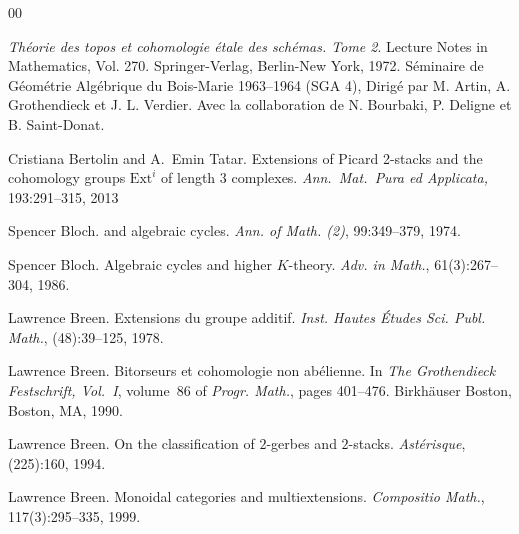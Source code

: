 \documentclass{amsart}
\numberwithin{equation}{subsection}
\theoremstyle{remark}
\theoremstyle{remark}
\begin{document}
  
\begin{thebibliography}{00}

 \emph{Th\'eorie des topos et cohomologie \'etale des sch\'emas. {T}ome 2}.
\newblock Lecture Notes in Mathematics, Vol. 270. Springer-Verlag, Berlin-New
  York, 1972.
\newblock S{\'e}minaire de G{\'e}om{\'e}trie Alg{\'e}brique du Bois-Marie
  1963--1964 (SGA 4), Dirig{\'e} par M. Artin, A. Grothendieck et J. L.
  Verdier. Avec la collaboration de N. Bourbaki, P. Deligne et B. Saint-Donat.

  Cristiana Bertolin and A.~Emin Tatar.
  \newblock Extensions of Picard 2-stacks and the cohomology groups $\mathrm{Ext}^i$ of length 3 complexes.
  \newblock \emph{Ann.\ Mat.\ Pura ed Applicata,} 193:291--315, 2013

Spencer Bloch.
 and algebraic cycles.
\newblock \emph{Ann. of Math. (2)}, 99:349--379, 1974.

Spencer Bloch.
\newblock Algebraic cycles and higher {$K$}-theory.
\newblock \emph{Adv. in Math.}, 61(3):267--304, 1986.

 Lawrence Breen.
\newblock Extensions du groupe additif.
\newblock \emph{Inst. Hautes \'Etudes Sci. Publ. Math.}, (48):39--125, 1978.

Lawrence Breen.  \newblock Bitorseurs et cohomologie non ab\'elienne.
\newblock In \emph{The {G}rothendieck {F}estschrift, {V}ol.\ {I}}, volume~86 of
  \emph{Progr. Math.}, pages 401--476. Birkh\"auser Boston, Boston, MA, 1990.

 Lawrence Breen.
\newblock On the classification of {$2$}-gerbes and {$2$}-stacks.
\newblock \emph{Ast\'erisque}, (225):160, 1994.


 Lawrence Breen.
\newblock Monoidal categories and multiextensions.
\newblock \emph{Compositio Math.}, 117(3):295--335, 1999.


\end{thebibliography}
\end{document}
